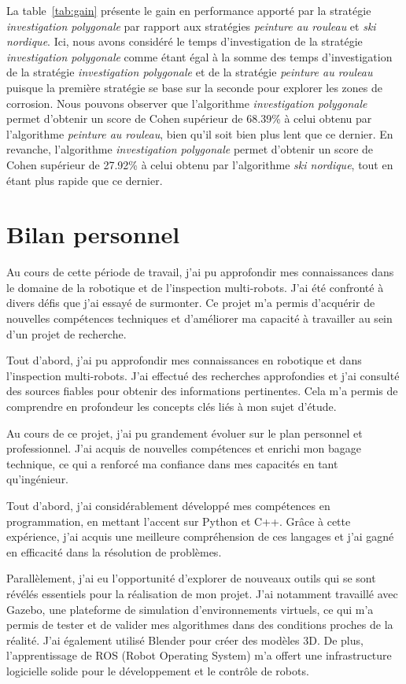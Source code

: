 \documentclass[english,RandD]{rapportPFE}  %
\begin{document}
			La table~\ref{tab:gain} présente le gain en performance apporté par la stratégie \textit{investigation polygonale} par rapport aux stratégies \textit{peinture au rouleau} et \textit{ski nordique}.
			Ici, nous avons considéré le temps d'investigation de la stratégie \textit{investigation polygonale} comme étant égal à la somme des temps d'investigation de la stratégie \textit{investigation polygonale} et de la stratégie \textit{peinture au rouleau} puisque la première stratégie se base sur la seconde pour explorer les zones de corrosion.
			Nous pouvons observer que l'algorithme \textit{investigation polygonale} permet d'obtenir un score de Cohen supérieur de 68.39\% à celui obtenu par l'algorithme \textit{peinture au rouleau}, bien qu'il soit bien plus lent que ce dernier.
			En revanche, l'algorithme \textit{investigation polygonale} permet d'obtenir un score de Cohen supérieur de 27.92\% à celui obtenu par l'algorithme \textit{ski nordique}, tout en étant plus rapide que ce dernier.
	\section{Bilan personnel}
		Au cours de cette période de travail, j'ai pu approfondir mes connaissances dans le domaine de la robotique et de l'inspection multi-robots.
		J'ai été confronté à divers défis que j'ai essayé de surmonter.
		Ce projet m'a permis d'acquérir de nouvelles compétences techniques et d'améliorer ma capacité à travailler au sein d'un projet de recherche.

		Tout d'abord, j'ai pu approfondir mes connaissances en robotique et dans l'inspection multi-robots.
		J'ai effectué des recherches approfondies et j'ai consulté des sources fiables pour obtenir des informations pertinentes.
		Cela m'a permis de comprendre en profondeur les concepts clés liés à mon sujet d'étude.

		Au cours de ce projet, j'ai pu grandement évoluer sur le plan personnel et professionnel.
		J'ai acquis de nouvelles compétences et enrichi mon bagage technique, ce qui a renforcé ma confiance dans mes capacités en tant qu'ingénieur.

		Tout d'abord, j'ai considérablement développé mes compétences en programmation, en mettant l'accent sur Python et C++.
		Grâce à cette expérience, j'ai acquis une meilleure compréhension de ces langages et j'ai gagné en efficacité dans la résolution de problèmes.

		Parallèlement, j'ai eu l'opportunité d'explorer de nouveaux outils qui se sont révélés essentiels pour la réalisation de mon projet.
		J'ai notamment travaillé avec Gazebo, une plateforme de simulation d'environnements virtuels, ce qui m'a permis de tester et de valider mes algorithmes dans des conditions proches de la réalité.
		J'ai également utilisé Blender pour créer des modèles 3D. De plus, l'apprentissage de ROS (Robot Operating System) m'a offert une infrastructure logicielle solide pour le développement et le contrôle de robots.
\end{document}
